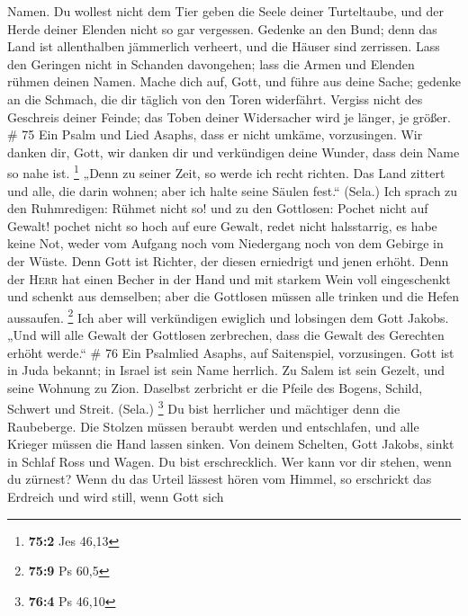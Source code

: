 Namen.  Du wollest nicht dem Tier geben die Seele deiner
Turteltaube, und der Herde deiner Elenden nicht so gar vergessen.
 Gedenke an den Bund; denn das Land ist allenthalben
jämmerlich verheert, und die Häuser sind zerrissen.  Lass
den Geringen nicht in Schanden davongehen; lass die Armen und Elenden
rühmen deinen Namen.  Mache dich auf, Gott, und führe aus
deine Sache; gedenke an die Schmach, die dir täglich von den Toren
widerfährt.  Vergiss nicht des Geschreis deiner Feinde;
das Toben deiner Widersacher wird je länger, je größer. \# 75
 Ein Psalm und Lied Asaphs, dass er nicht umkäme,
vorzusingen.  Wir danken dir, Gott, wir danken dir und
verkündigen deine Wunder, dass dein Name so nahe ist. \footnote{\textbf{75:2}
  Jes 46,13}  „Denn zu seiner Zeit, so werde ich recht
richten.  Das Land zittert und alle, die darin wohnen;
aber ich halte seine Säulen fest.`` (Sela.)  Ich sprach zu
den Ruhmredigen: Rühmet nicht so! und zu den Gottlosen: Pochet nicht auf
Gewalt!  pochet nicht so hoch auf eure Gewalt, redet nicht
halsstarrig,  es habe keine Not, weder vom Aufgang noch
vom Niedergang noch von dem Gebirge in der Wüste.  Denn
Gott ist Richter, der diesen erniedrigt und jenen erhöht. 
Denn der \textsc{Herr} hat einen Becher in der Hand und mit starkem Wein
voll eingeschenkt und schenkt aus demselben; aber die Gottlosen müssen
alle trinken und die Hefen aussaufen. \footnote{\textbf{75:9} Ps 60,5}
 Ich aber will verkündigen ewiglich und lobsingen dem
Gott Jakobs.  „Und will alle Gewalt der Gottlosen
zerbrechen, dass die Gewalt des Gerechten erhöht werde.`` \# 76
 Ein Psalmlied Asaphs, auf Saitenspiel, vorzusingen.
 Gott ist in Juda bekannt; in Israel ist sein Name
herrlich.  Zu Salem ist sein Gezelt, und seine Wohnung zu
Zion.  Daselbst zerbricht er die Pfeile des Bogens,
Schild, Schwert und Streit. (Sela.) \footnote{\textbf{76:4} Ps 46,10}
 Du bist herrlicher und mächtiger denn die Raubeberge.
 Die Stolzen müssen beraubt werden und entschlafen, und
alle Krieger müssen die Hand lassen sinken.  Von deinem
Schelten, Gott Jakobs, sinkt in Schlaf Ross und Wagen.  Du
bist erschrecklich. Wer kann vor dir stehen, wenn du zürnest?
 Wenn du das Urteil lässest hören vom Himmel, so
erschrickt das Erdreich und wird still,  wenn Gott sich
